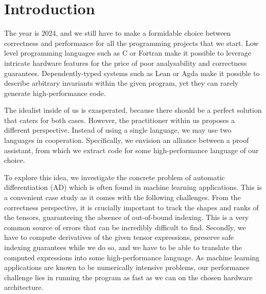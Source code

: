 \section{Introduction\label{sec:intro}}

The year is 2024, and we still have to make a formidable choice between
correctness and performance for all the programming projects that we start.
Low level programming languages such as C or Fortran make it possible to leverage
intricate hardware features for the price of poor analysability and
correctness guarantees.  Dependently-typed systems such as Lean or Agda make it possible
to describe arbitrary invariants within the given program, yet they can
rarely generate high-performance code.

The idealist inside of us is exasperated, because there should be a perfect
solution that caters for both cases.  However, the practitioner within us
proposes a different perspective.
Instead of using a single language, we may use two languages
in cooperation.  Specifically, we envision an alliance between a
proof assistant, from which we extract code for some high-performance language of our choice.

To explore this idea, we investigate the concrete problem of automatic differentiation (AD) which
is often found in machine learning applications.  This is a convenient case study
as it comes with the following challenges.  From the correctness perspective,
it is crucially important to track the shapes and ranks of the tensors,
guaranteeing the absence of out-of-bound indexing.
This is a very common source of errors that can be incredibly difficult
to find.   Secondly, we have to compute derivatives of the given tensor expressions,
preserve safe indexing guarantees while we do so, and we have to be able to translate
the computed expressions into some high-performance language.
As machine learning applications
are known to be numerically intensive problems, our performance challenge lies
in running the program as fast as we can on the chosen hardware architecture.

